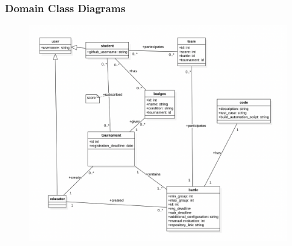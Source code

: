 \subsubsection{Domain Class Diagrams}
\begin{figure}[h]
    \centering
    \includegraphics[width=1\textwidth]{RASD/2Overall_Description/res/CD.png}
\end{figure}
\clearpage
